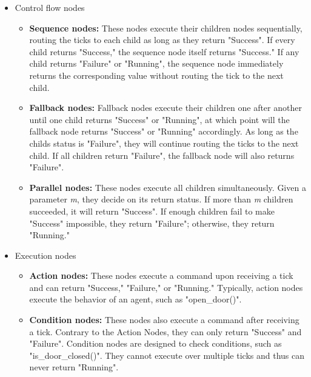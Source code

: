 \begin{itemize}
	\item Control flow nodes
	\begin{itemize}
		\item \textbf{Sequence nodes:} These nodes execute their children nodes sequentially, routing the ticks to each child as long as they return "Success".  If every child returns "Success," the sequence node itself returns "Success." If any child returns "Failure" or "Running", the sequence node immediately returns the corresponding value without routing the tick to the next child.
		
		\item \textbf{Fallback nodes:} Fallback nodes execute their children one after another until one child returns "Success" or "Running", at which point will the fallback node returns "Success" or "Running" accordingly. As long as the childs status is "Failure", they will continue routing the ticks to the next child. If all children return "Failure", the fallback node will also returns "Failure".
		
		\item \textbf{Parallel nodes:} These nodes execute all children simultaneously. Given a parameter \textit{m}, they decide on its return status. If more than \textit{m} children succeeded, it will return "Success".  If enough children fail to make "Success" impossible, they return "Failure"; otherwise, they return "Running."
	\end{itemize}
	\item Execution nodes
	\begin{itemize}
		\item \textbf{Action nodes:} These nodes execute a command upon receiving a tick and can return "Success," "Failure," or "Running." Typically, action nodes execute the behavior of an agent, such as "open\_door()".
		
		\item \textbf{Condition nodes:} These nodes also execute a command after receiving a tick. Contrary to the  Action Nodes, they can only return "Success" and "Failure".  Condition nodes are designed to check conditions, such as "is\_door\_closed()". They cannot execute over multiple ticks and thus can never return "Running".
	\end{itemize}
\end{itemize}